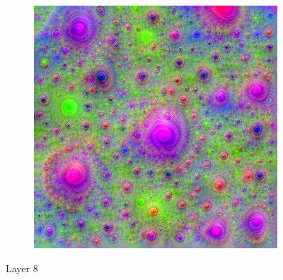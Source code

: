 \begin{figure}
    \hfill
    \begin{subfigure}[t]{0.31\textwidth}
        \captionsetup{justification=centering}
        \centering
        \includegraphics[width=.7\linewidth]{figuras/feat_vis/experiments/intermediary/l8/random_image_pl6_lr2.2e-1_layer17.png}
        \caption{}
    \end{subfigure}

    \caption{Layer 8}

\end{figure}

